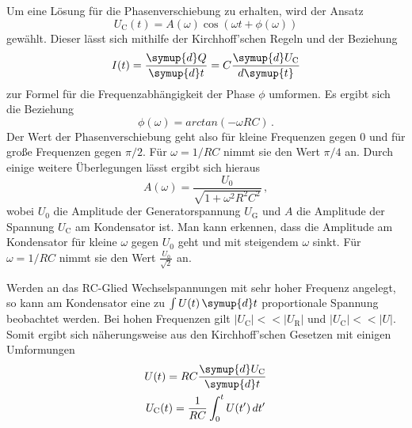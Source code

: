 Um eine Lösung für die Phasenverschiebung zu erhalten, wird der Ansatz
\begin{equation}
  U_{\text{C}}(t)=A(\omega)\cos(\omega t + \phi(\omega))
\end{equation}
gewählt. Dieser lässt sich mithilfe der Kirchhoff'schen Regeln und der Beziehung
\begin{equation}
  I(t)=\frac{\symup{d}Q}{\symup{d}t}=C\frac{\symup{d}U_{\text{C}}}{d\symup{t}}
\end{equation}
zur Formel für die Frequenzabhängigkeit der Phase $\phi$ umformen. Es ergibt sich die
Beziehung
\begin{equation}
  \phi(\omega)=arctan(-\omega R C) \,.
\end{equation}
Der Wert der Phasenverschiebung geht also für kleine Frequenzen gegen $0$ und für
große Frequenzen gegen $\pi/2$. Für $\omega=1/RC$ nimmt sie den Wert
$\pi/4$ an.
Durch einige weitere Überlegungen lässt ergibt sich hieraus
\begin{equation}
  A(\omega)=\frac{U_{\text{0}}}{\sqrt{1+\omega^2 R^2 C^2}} \,,
  \label{eqn:kondensatorfrequenz}
\end{equation}
wobei $U_{\text{0}}$ die Amplitude der Generatorspannung $U_{\text{G}}$ und $A$ die
Amplitude der Spannung $U_{\text{C}}$ am Kondensator ist.
Man kann erkennen, dass die Amplitude am Kondensator für kleine $\omega$ gegen $U_{\text{0}}$ geht
und mit steigendem $\omega$ sinkt. Für $\omega=1/RC$ nimmt sie den Wert
$\frac{U_{\text{0}}}{\sqrt{2}}$ an.

Werden an das RC-Glied Wechselspannungen mit sehr hoher Frequenz angelegt, so kann
am Kondensator eine zu $\int U(t)\,\symup{d}t$ proportionale Spannung beobachtet werden.
Bei hohen Frequenzen gilt $\lvert U_{\text{C}} \rvert << \lvert U_{\text{R}} \rvert$
und $\lvert U_{\text{C}} \rvert << \lvert U \rvert$. Somit ergibt sich näherungsweise
aus den Kirchhoff'schen Gesetzen mit einigen Umformungen
\begin{gather}
  U(t)= R C \frac{\symup{d}U_{\text{C}}}{\symup{d}t} \\
  U_{\text{C}}(t)=\frac{1}{RC}\int_0^t U(t')\, dt'
\end{gather}



\label{sec:Theorie}
